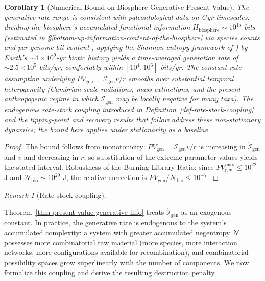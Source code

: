 \documentclass[11pt]{article}
\theoremstyle{plain}
\newtheorem{corollary}[theorem]{Corollary}
\theoremstyle{definition}
\theoremstyle{remark}
\newtheorem{remark}{Remark}
\begin{document}
\begin{corollary}[Numerical Bound on Biosphere Generative Present Value]
The generative-rate range is consistent with paleontological data on Gyr timescales: dividing the biosphere's accumulated functional information $H_{\text{biosphere}} \sim 10^{15}$ bits (estimated in §\ref{bottom-up-information-content-of-the-biosphere} via species counts \citep{Mora2011} and per-genome bit content \citep{Milo2015}, applying the Shannon-entropy framework of \citep{Adami2004}) by Earth's $\sim 4 \times 10^9$-yr biotic history yields a time-averaged generation rate of $\sim 2.5 \times 10^5$ bits/yr, comfortably within $[10^4, 10^6]$ bits/yr. The constant-rate assumption underlying $PV_{\text{gen}} = \dot{\mathcal{I}}_{\text{gen}} v / r$ smooths over substantial temporal heterogeneity (Cambrian-scale radiations, mass extinctions, and the present anthropogenic regime in which $\dot{\mathcal{I}}_{\text{gen}}$ may be locally negative for many taxa). The endogenous rate-stock coupling introduced in Definition~\ref{def-rate-stock-coupling} and the tipping-point and recovery results that follow address these non-stationary dynamics; the bound here applies under stationarity as a baseline.
\end{corollary}

\begin{proof}
The bound follows from monotonicity: $PV_{\text{gen}} = \dot{\mathcal{I}}_{\text{gen}} v / r$ is increasing in $\dot{\mathcal{I}}_{\text{gen}}$ and $v$ and decreasing in $r$, so substitution of the extreme parameter values yields the stated interval. Robustness of the Burning-Library Ratio: since $PV_{\text{gen}}^{\max} \leq 10^{22}$ J and $\mathcal{N}_{\text{bio}} \sim 10^{29}$ J, the relative correction is $PV_{\text{gen}}/\mathcal{N}_{\text{bio}} \leq 10^{-7}$.
\end{proof}

\begin{remark}[Rate-stock coupling]
\label{rem-rate-stock-coupling}

Theorem~\ref{thm-present-value-generative-info} treats $\dot{\mathcal{I}}_{\text{gen}}$ as an exogenous constant. In practice, the generative rate is endogenous to the system's accumulated complexity: a system with greater accumulated negentropy $\mathcal{N}$ possesses more combinatorial raw material (more species, more interaction networks, more configurations available for recombination), and combinatorial possibility spaces grow superlinearly with the number of components. We now formalize this coupling and derive the resulting destruction penalty.
\end{remark}
\end{document}
